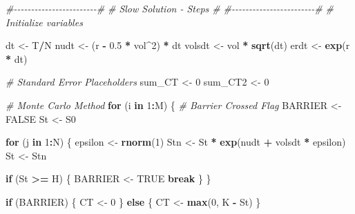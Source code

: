 \documentclass[
]{article}
\newenvironment{Shaded}{\begin{snugshade}}{\end{snugshade}}
\newcommand{\CommentTok}[1]{\textcolor[rgb]{0.56,0.35,0.01}{\textit{#1}}}
\newcommand{\ConstantTok}[1]{\textcolor[rgb]{0.56,0.35,0.01}{#1}}
\newcommand{\ControlFlowTok}[1]{\textcolor[rgb]{0.13,0.29,0.53}{\textbf{#1}}}
\newcommand{\DecValTok}[1]{\textcolor[rgb]{0.00,0.00,0.81}{#1}}
\newcommand{\FloatTok}[1]{\textcolor[rgb]{0.00,0.00,0.81}{#1}}
\newcommand{\FunctionTok}[1]{\textcolor[rgb]{0.13,0.29,0.53}{\textbf{#1}}}
\newcommand{\NormalTok}[1]{#1}
\newcommand{\OtherTok}[1]{\textcolor[rgb]{0.56,0.35,0.01}{#1}}
\newcommand{\SpecialCharTok}[1]{\textcolor[rgb]{0.81,0.36,0.00}{\textbf{#1}}}
\begin{document}
\begin{Shaded}
\begin{Highlighting}[]
\CommentTok{\#{-}{-}{-}{-}{-}{-}{-}{-}{-}{-}{-}{-}{-}{-}{-}{-}{-}{-}{-}{-}{-}{-}{-}{-}\#}
\CommentTok{\# Slow Solution {-} Steps  \#}
\CommentTok{\#{-}{-}{-}{-}{-}{-}{-}{-}{-}{-}{-}{-}{-}{-}{-}{-}{-}{-}{-}{-}{-}{-}{-}{-}\#}
\CommentTok{\# Initialize variables}

\NormalTok{dt }\OtherTok{\textless{}{-}}\NormalTok{ T}\SpecialCharTok{/}\NormalTok{N}
\NormalTok{nudt }\OtherTok{\textless{}{-}}\NormalTok{ (r }\SpecialCharTok{{-}} \FloatTok{0.5} \SpecialCharTok{*}\NormalTok{ vol}\SpecialCharTok{\^{}}\DecValTok{2}\NormalTok{) }\SpecialCharTok{*}\NormalTok{ dt}
\NormalTok{volsdt }\OtherTok{\textless{}{-}}\NormalTok{ vol }\SpecialCharTok{*} \FunctionTok{sqrt}\NormalTok{(dt)}
\NormalTok{erdt }\OtherTok{\textless{}{-}} \FunctionTok{exp}\NormalTok{(r }\SpecialCharTok{*}\NormalTok{ dt)}

\CommentTok{\# Standard Error Placeholders}
\NormalTok{sum\_CT }\OtherTok{\textless{}{-}} \DecValTok{0}
\NormalTok{sum\_CT2 }\OtherTok{\textless{}{-}} \DecValTok{0}

\CommentTok{\# Monte Carlo Method}
\ControlFlowTok{for}\NormalTok{ (i }\ControlFlowTok{in} \DecValTok{1}\SpecialCharTok{:}\NormalTok{M) \{}
  \CommentTok{\# Barrier Crossed Flag}
\NormalTok{  BARRIER }\OtherTok{\textless{}{-}} \ConstantTok{FALSE}
\NormalTok{  St }\OtherTok{\textless{}{-}}\NormalTok{ S0}
  
  \ControlFlowTok{for}\NormalTok{ (j }\ControlFlowTok{in} \DecValTok{1}\SpecialCharTok{:}\NormalTok{N) \{}
\NormalTok{    epsilon }\OtherTok{\textless{}{-}} \FunctionTok{rnorm}\NormalTok{(}\DecValTok{1}\NormalTok{)}
\NormalTok{    Stn }\OtherTok{\textless{}{-}}\NormalTok{ St }\SpecialCharTok{*} \FunctionTok{exp}\NormalTok{(nudt }\SpecialCharTok{+}\NormalTok{ volsdt }\SpecialCharTok{*}\NormalTok{ epsilon)}
\NormalTok{    St }\OtherTok{\textless{}{-}}\NormalTok{ Stn}
    
    \ControlFlowTok{if}\NormalTok{ (St }\SpecialCharTok{\textgreater{}=}\NormalTok{ H) \{}
\NormalTok{      BARRIER }\OtherTok{\textless{}{-}} \ConstantTok{TRUE}
      \ControlFlowTok{break}
\NormalTok{    \}}
\NormalTok{  \}}
  
  \ControlFlowTok{if}\NormalTok{ (BARRIER) \{}
\NormalTok{    CT }\OtherTok{\textless{}{-}} \DecValTok{0}
\NormalTok{  \} }\ControlFlowTok{else}\NormalTok{ \{}
\NormalTok{    CT }\OtherTok{\textless{}{-}} \FunctionTok{max}\NormalTok{(}\DecValTok{0}\NormalTok{, K }\SpecialCharTok{{-}}\NormalTok{ St)}
\NormalTok{  \}}
  

\end{Highlighting}
\end{Shaded}
\end{document}
